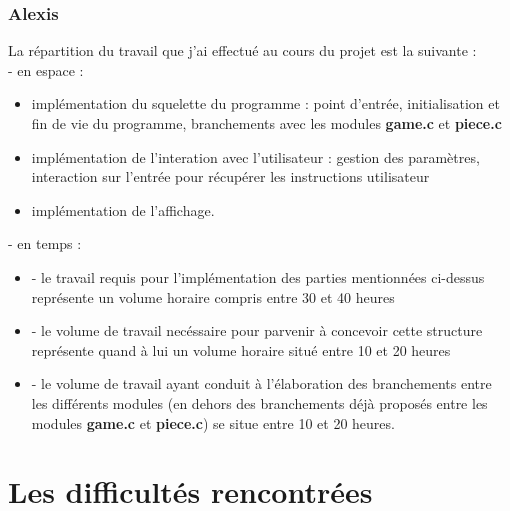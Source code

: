 \documentclass{report}
\begin{document}
\subsection*{Alexis}
La répartition du travail que j'ai effectué au cours du projet est la suivante :\\
- en espace :
\begin{itemize}
\item implémentation du squelette du programme : point d'entrée, initialisation et fin de vie du programme, branchements avec les modules \textbf{game.c} et \textbf{piece.c}
\item implémentation de l'interation avec l'utilisateur : gestion des paramètres, interaction sur l'entrée pour récupérer les instructions utilisateur
\item implémentation de l'affichage.
\end{itemize}
- en temps :
\begin{itemize}
\item
- le travail requis pour l'implémentation des parties mentionnées ci-dessus représente un volume horaire compris entre 30 et 40 heures 
\item
- le volume de travail necéssaire pour parvenir à concevoir cette structure représente quand à lui un volume horaire situé entre 10 et 20 heures 
\item
- le volume de travail ayant conduit à l'élaboration des branchements entre les différents modules (en dehors des branchements déjà proposés entre les modules \textbf{game.c} et \textbf{piece.c}) se situe entre 10 et 20 heures.
\end{itemize}



\chapter{Les difficultés rencontrées}
\setcounter{section}{0}
\end{document}
